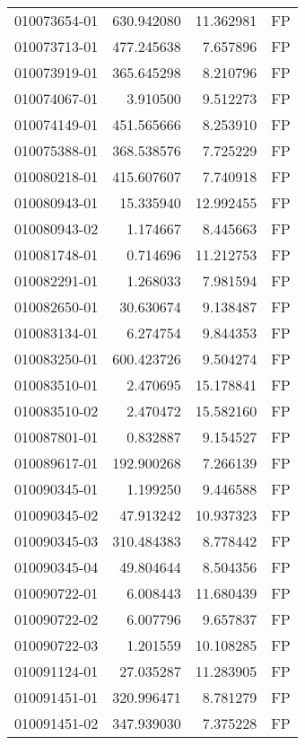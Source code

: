 \begin{tabular}{lrrl}
010073654-01 &  630.942080 &      11.362981 &   FP \\
010073713-01 &  477.245638 &       7.657896 &   FP \\
010073919-01 &  365.645298 &       8.210796 &   FP \\
010074067-01 &    3.910500 &       9.512273 &   FP \\
010074149-01 &  451.565666 &       8.253910 &   FP \\
010075388-01 &  368.538576 &       7.725229 &   FP \\
010080218-01 &  415.607607 &       7.740918 &   FP \\
010080943-01 &   15.335940 &      12.992455 &   FP \\
010080943-02 &    1.174667 &       8.445663 &   FP \\
010081748-01 &    0.714696 &      11.212753 &   FP \\
010082291-01 &    1.268033 &       7.981594 &   FP \\
010082650-01 &   30.630674 &       9.138487 &   FP \\
010083134-01 &    6.274754 &       9.844353 &   FP \\
010083250-01 &  600.423726 &       9.504274 &   FP \\
010083510-01 &    2.470695 &      15.178841 &   FP \\
010083510-02 &    2.470472 &      15.582160 &   FP \\
010087801-01 &    0.832887 &       9.154527 &   FP \\
010089617-01 &  192.900268 &       7.266139 &   FP \\
010090345-01 &    1.199250 &       9.446588 &   FP \\
010090345-02 &   47.913242 &      10.937323 &   FP \\
010090345-03 &  310.484383 &       8.778442 &   FP \\
010090345-04 &   49.804644 &       8.504356 &   FP \\
010090722-01 &    6.008443 &      11.680439 &   FP \\
010090722-02 &    6.007796 &       9.657837 &   FP \\
010090722-03 &    1.201559 &      10.108285 &   FP \\
010091124-01 &   27.035287 &      11.283905 &   FP \\
010091451-01 &  320.996471 &       8.781279 &   FP \\
010091451-02 &  347.939030 &       7.375228 &   FP \\

\end{tabular}
